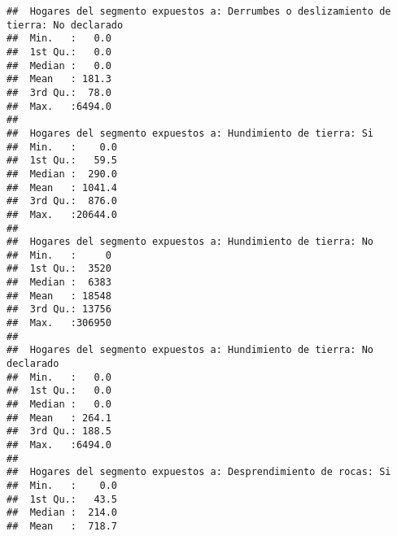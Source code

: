 \documentclass[11pt,]{article}
\begin{document}
\begin{verbatim}
##  Hogares del segmento expuestos a: Derrumbes o deslizamiento de tierra: No declarado
##  Min.   :   0.0                                                                     
##  1st Qu.:   0.0                                                                     
##  Median :   0.0                                                                     
##  Mean   : 181.3                                                                     
##  3rd Qu.:  78.0                                                                     
##  Max.   :6494.0                                                                     
##                                                                                     
##  Hogares del segmento expuestos a: Hundimiento de tierra: Si
##  Min.   :    0.0                                            
##  1st Qu.:   59.5                                            
##  Median :  290.0                                            
##  Mean   : 1041.4                                            
##  3rd Qu.:  876.0                                            
##  Max.   :20644.0                                            
##                                                             
##  Hogares del segmento expuestos a: Hundimiento de tierra: No
##  Min.   :     0                                             
##  1st Qu.:  3520                                             
##  Median :  6383                                             
##  Mean   : 18548                                             
##  3rd Qu.: 13756                                             
##  Max.   :306950                                             
##                                                             
##  Hogares del segmento expuestos a: Hundimiento de tierra: No declarado
##  Min.   :   0.0                                                       
##  1st Qu.:   0.0                                                       
##  Median :   0.0                                                       
##  Mean   : 264.1                                                       
##  3rd Qu.: 188.5                                                       
##  Max.   :6494.0                                                       
##                                                                       
##  Hogares del segmento expuestos a: Desprendimiento de rocas: Si
##  Min.   :    0.0                                               
##  1st Qu.:   43.5                                               
##  Median :  214.0                                               
##  Mean   :  718.7                                               

\end{verbatim}
\end{document}
